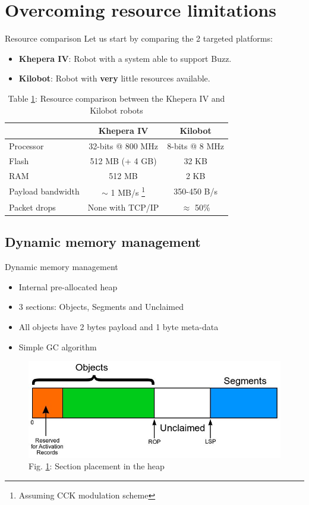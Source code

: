 \documentclass{beamer}
\begin{document}
	\section{Overcoming resource limitations}
	\begin{frame}{Resource comparison}
		Let us start by comparing the 2 targeted platforms:
		\begin{itemize}
			\item {\bfseries Khepera IV}: Robot with a system able to support Buzz.
			\item {\bfseries Kilobot}: Robot with \textbf{very} little resources available.
		\end{itemize}
		\begin{table}
			\begin{tabular}{l|c|c}
				& Khepera IV        & Kilobot\\
				\hline
				Processor         & 32-bits @ 800 MHz & 8-bits @ 8 MHz\\
				Flash             & 512 MB (+ 4 GB)   & 32 KB\\
				RAM               & 512 MB            & 2 KB\\
				Payload bandwidth & $\sim$ 1 MB/s \footnote{Assuming CCK modulation scheme} \cite{khepera_wifi}  & 350-450 B/s\\
				Packet drops      & None with TCP/IP  & $\approx$ 50\%
			\end{tabular}
			\caption{
				\label{table:khepera kilobot comparison}Table \ref{table:khepera kilobot comparison}: Resource comparison between the Khepera IV and Kilobot robots \cite{khepera_specs}}
		\end{table}
	\end{frame}
	\subsection{Dynamic memory management}
	\begin{frame}{Dynamic memory management}
		\begin{itemize}
			\item Internal pre-allocated heap %
			\item 3 sections: Objects, Segments and Unclaimed
			\item All objects have 2 bytes payload and 1 byte meta-data
			\item Simple GC algorithm
		\end{itemize}
		\begin{figure}
			\centering
			\includegraphics[width=\linewidth]{schematic_heap.jpg}
			\caption{
				\label{figure:heap sections}Fig. \ref{figure:heap sections}: Section placement in the heap}
		\end{figure}
	\end{frame}
\end{document}
